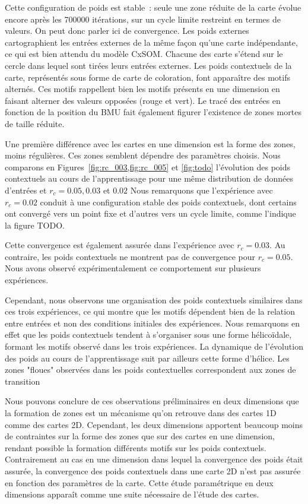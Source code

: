 \documentclass[../main]{subfiles}
\begin{document}
Cette configuration de poids est stable~: seule une zone réduite de la carte évolue encore après les 700000 itérations, sur un cycle limite restreint en termes de valeurs. 
On peut donc parler ici de convergence.
Les poids externes cartographient les entrées externes de la même façon qu'une carte indépendante, ce qui est bien attendu du modèle CxSOM. Chacune des carte s'étend sur le cercle dans lequel sont tirées leurs entrées externes.
Les poids contextuels de la carte, représentés sous forme de carte de coloration, font apparaître des motifs alternés.
Ces motifs rappellent bien les motifs présents en une dimension en faisant alterner des valeurs opposées (rouge et vert).
Le tracé des entrées en fonction de la position du BMU fait également figurer l'existence de zones mortes de taille réduite.


Une première différence avec les cartes en une dimension est la forme des zones, moins régulières. Ces zones semblent dépendre des paramètres choisis.
Nous comparons en Figures~\ref{fig:rc_003,fig:rc_005} et \ref{fig:todo} l'évolution des poids contextuels au cours de l'apprentissage pour une même distribution de données d'entrées et $r_c = 0.05, 0.03$ et $0.02$
Nous remarquons que l'expérience avec $r_c = 0.02$ conduit à une configuration stable des poids contextuels, dont certains ont convergé vers un point fixe et d'autres vers un cycle limite, comme l'indique la figure TODO. 


Cette convergence est également assurée dans l'expérience avec $r_c = 0.03$. Au contraire, les poids contextuels ne montrent pas de convergence pour $r_c =0.05$. Nous avons observé expérimentalement ce comportement sur plusieurs expériences.

Cependant, nous observons une organisation des poids contextuels similaires dans ces trois expériences, ce qui montre que les motifs dépendent bien de la relation entre entrées et non des conditions initiales des expériences. 
Nous remarquons en effet que les poids contextuels tendent à s'organiser sous une forme hélicoïdale, formant les motifs observé dans les trois expériences.
La dynamique de l'évolution des poids au cours de l'apprentissage suit par ailleurs cette forme d'hélice. 
Les zones "floues" observées dans les poids contextuelles correspondent aux zones de transition

Nous pouvons conclure de ces observations préliminaires en deux dimensions que la formation de zones est un mécanisme qu'on retrouve dans des cartes 1D comme des cartes 2D. Cependant, les deux dimensions apportent beaucoup moins de contraintes sur la forme des zones que sur des cartes en une dimension, rendant possible la formation différents motifs sur les poids contextuels. 
Contrairement au cas en une dimension dans lequel la convergence des poids était assurée, la convergence des poids contextuels dans une carte 2D n'est pas assurée en fonction des paramètres de la carte. Cette étude paramétrique en deux dimensions apparaît comme une suite nécessaire de l'étude des cartes.
\end{document}

